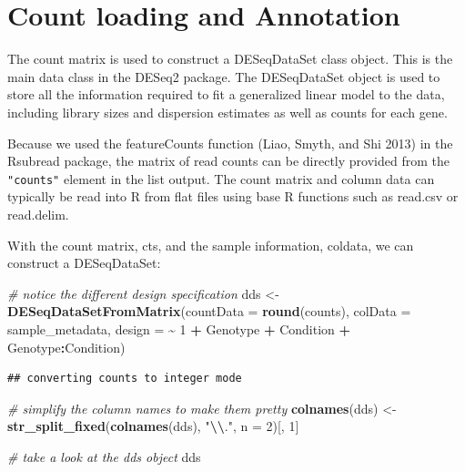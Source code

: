 \documentclass[
]{book}
\newenvironment{Shaded}{\begin{snugshade}}{\end{snugshade}}
\newcommand{\AttributeTok}[1]{\textcolor[rgb]{0.13,0.29,0.53}{#1}}
\newcommand{\CommentTok}[1]{\textcolor[rgb]{0.56,0.35,0.01}{\textit{#1}}}
\newcommand{\DecValTok}[1]{\textcolor[rgb]{0.00,0.00,0.81}{#1}}
\newcommand{\FunctionTok}[1]{\textcolor[rgb]{0.13,0.29,0.53}{\textbf{#1}}}
\newcommand{\NormalTok}[1]{#1}
\newcommand{\OtherTok}[1]{\textcolor[rgb]{0.56,0.35,0.01}{#1}}
\newcommand{\SpecialCharTok}[1]{\textcolor[rgb]{0.81,0.36,0.00}{\textbf{#1}}}
\newcommand{\StringTok}[1]{\textcolor[rgb]{0.31,0.60,0.02}{#1}}
\begin{document}
\hypertarget{count-loading-and-annotation-1}{%
\section{Count loading and Annotation}\label{count-loading-and-annotation-1}}

The count matrix is used to construct a DESeqDataSet class object. This is the main data class in the DESeq2 package. The DESeqDataSet object is used to store all the information required to fit a generalized linear model to the data, including library sizes and dispersion estimates as well as counts for each gene.

Because we used the featureCounts function (Liao, Smyth, and Shi 2013) in the Rsubread package, the matrix of read counts can be directly provided from the \texttt{"counts"} element in the list output. The count matrix and column data can typically be read into R from flat files using base R functions such as read.csv or read.delim.

With the count matrix, cts, and the sample information, coldata, we can construct a DESeqDataSet:

\begin{Shaded}
\begin{Highlighting}[]
\CommentTok{\# notice the different design specification}
\NormalTok{dds }\OtherTok{\textless{}{-}} \FunctionTok{DESeqDataSetFromMatrix}\NormalTok{(}\AttributeTok{countData =} \FunctionTok{round}\NormalTok{(counts),}
                              \AttributeTok{colData =}\NormalTok{ sample\_metadata,}
                              \AttributeTok{design =} \SpecialCharTok{\textasciitilde{}} \DecValTok{1} \SpecialCharTok{+}\NormalTok{ Genotype }\SpecialCharTok{+}\NormalTok{ Condition }\SpecialCharTok{+}\NormalTok{ Genotype}\SpecialCharTok{:}\NormalTok{Condition)}
\end{Highlighting}
\end{Shaded}

\begin{verbatim}
## converting counts to integer mode
\end{verbatim}

\begin{Shaded}
\begin{Highlighting}[]
\CommentTok{\# simplify the column names to make them pretty}
\FunctionTok{colnames}\NormalTok{(dds) }\OtherTok{\textless{}{-}} \FunctionTok{str\_split\_fixed}\NormalTok{(}\FunctionTok{colnames}\NormalTok{(dds), }\StringTok{"}\SpecialCharTok{\textbackslash{}\textbackslash{}}\StringTok{."}\NormalTok{, }\AttributeTok{n =} \DecValTok{2}\NormalTok{)[, }\DecValTok{1}\NormalTok{]}

\CommentTok{\# take a look at the dds object}
\NormalTok{dds}
\end{Highlighting}
\end{Shaded}
\end{document}
